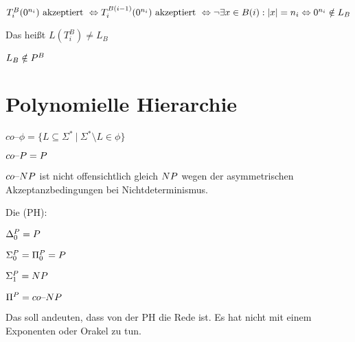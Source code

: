 \begin{beweis}
    $T_i^B(0^{n_i}) \text{ akzeptiert } \\\Leftrightarrow 
    T_i^{B(i-1)}(0^{n_i}) \text{ akzeptiert } \\\Leftrightarrow 
    \neg \exists x \in B(i): |x| = n_i \\\Leftrightarrow 
    0^{n_i} \notin L_B
    $

    Das heißt $L(T_i^B) \neq L_B$

    $L_B \notin P^B$

\end{beweis}





\section{Polynomielle Hierarchie}

\begin{definition}
    
    $co\text{--}\phi = \{ L \subseteq \Sigma^\ast \ |\ \Sigma^\ast \setminus L \in \phi  \}$

\end{definition}

$co\text{--}P = P$

$co\text{--}NP$ ist nicht offensichtlich gleich $NP$ wegen der asymmetrischen Akzeptanzbedingungen bei Nichtdeterminismus.


\begin{definition}
    
    Die  (PH):

    $\Delta_0^{P} = P$

    $\Sigma_0^{P} = \Pi_0^{P} = P$


    
    $\Sigma_1^{P} = NP$

    $\Pi^{P} = co\text{--}NP$

    Das soll andeuten, dass von der PH die Rede ist. Es hat nicht mit einem Exponenten oder Orakel zu tun.

\end{definition}


    


